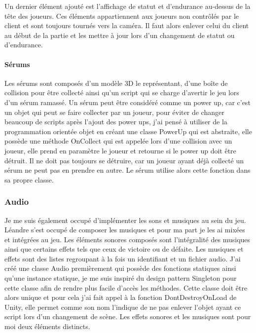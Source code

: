 \documentclass{article}
\begin{document}
Un dernier élément ajouté est l'affichage de statut et d'endurance au-dessus de la tête des joueurs. Ces éléments appartiennent aux joueurs non contrôlés par le client et sont toujours tournés vers la caméra. Il faut alors enlever celui du client au début de la partie et les mettre à jour lors d'un changement de statut ou d'endurance.


\paragraph{Sérums}


Les sérums sont composés d'un modèle 3D le représentant, d'une boîte de collision pour être collecté ainsi qu'un script qui se charge d'avertir le jeu lors d'un sérum ramassé.
Un sérum peut être considéré comme un power up, car c'est un objet qui peut se faire collecter par un joueur, pour éviter de changer beaucoup de scripts après l'ajout des power ups, j'ai pensé à utiliser de la programmation orientée objet en créant une classe PowerUp qui est abstraite, elle possède une méthode OnCollect qui est appelée lors d'une collision avec un joueur, elle prend en paramètre le joueur et retourne si le power up doit être détruit. Il ne doit pas toujours se détruire, car un joueur ayant déjà collecté un sérum ne peut pas en prendre en autre. Le sérum utilise alors cette fonction dans sa propre classe.


\subsubsection{Audio}


Je me suis également occupé d'implémenter les sons et musiques au sein du jeu. Léandre s'est occupé de composer les musiques et pour ma part je les ai mixées et intégrées au jeu. Les éléments sonores composés sont l'intégralité des musiques ainsi que certains effets tels que ceux de victoire ou de défaite.
Les musiques et effets sont des listes regroupant à la fois un identifiant et un fichier audio. J'ai créé une classe Audio premièrement qui possède des fonctions statiques ainsi qu'une instance statique, je me suis inspiré du design pattern Singleton pour cette classe afin de rendre plus facile d'accès les méthodes. Cette classe doit être alors unique et pour cela j'ai fait appel à la fonction DontDestroyOnLoad de Unity, elle permet comme son nom l'indique de ne pas enlever l'objet ayant ce script lors d'un changement de scène. Les effets sonores et les musiques sont pour moi deux éléments distincts.
\end{document}
